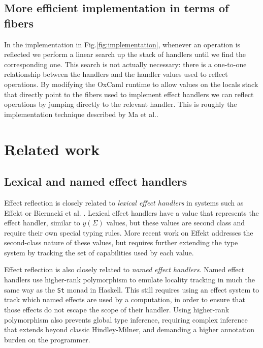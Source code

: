 \documentclass[acmsmall, screen, nonacm]{acmart}
\theoremstyle{definition}
\newcommand{\yoneda}[1]{y(#1)}
\begin{document}
\subsection{More efficient implementation in terms of fibers}

In the implementation in Fig.\ref{fig:implementation}, whenever an
operation is reflected we perform a linear search up the stack of
handlers until we find the corresponding one. This search is not
actually necessary: there is a one-to-one relationship between the
handlers and the handler values used to reflect operations. By modifying
the OxCaml runtime to allow values on the locals stack that directly
point to the fibers used to implement effect handlers we can reflect
operations by jumping directly to the relevant handler. This is roughly
the implementation technique described by Ma et al.\cite{ma2024lexical}.

\section{Related work}
\label{sec:related-work}

\subsection{Lexical and named effect handlers}

Effect reflection is closely related to \emph{lexical effect handlers}
in systems such as Effekt\cite{brachthauser2020effects} or Biernacki et
al. \cite{biernacki2019binders}. Lexical effect handlers have a value
that represents the effect handler, similar to $\yoneda{\Sigma}$ values,
but these values are second class and require their own special typing
rules. More recent work on Effekt\cite{brachthauser2022effects}
addresses the second-class nature of these values, but requires further
extending the type system by tracking the set of capabilities used by
each value.

Effect reflection is also closely related to \emph{named effect
  handlers}\cite{xie2022first}. Named effect handlers use higher-rank
polymorphism to emulate locality tracking in much the same way as the
\lstinline[style=haskell]{St} monad in Haskell. This still requires
using an effect system to track which named effects are used by a
computation, in order to ensure that those effects do not escape the
scope of their handler. Using higher-rank polymorphism also prevents
global type inference, requiring complex inference that extends beyond
classic Hindley-Milner, and demanding a higher annotation burden on the
programmer.
\end{document}
